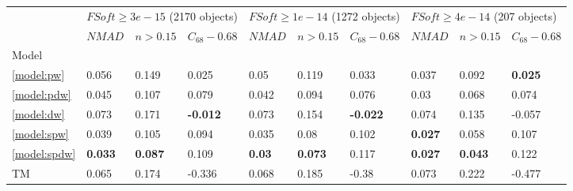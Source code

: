 \documentclass[fleqn,usenatbib]{mnras}
\begin{document}
\begin{table}
	\begin{tabular}{llllllllll}
            \hline
            {} & \multicolumn{3}{l}{$FSoft \geq 3e-15$ (2170 objects)} & \multicolumn{3}{l}{$FSoft \geq 1e-14$ (1272 objects)} & \multicolumn{3}{l}{$FSoft \geq 4e-14$ (207 objects)} \\
            {} &                            $NMAD$ &        $n>0.15$ &  $C_{68} - 0.68$ &                            $NMAD$ &        $n>0.15$ &  $C_{68} - 0.68$ &                           $NMAD$ &        $n>0.15$ & $C_{68} - 0.68$ \\
            Model          &                                   &                 &                  &                                   &                 &                  &                                  &                 &                 \\
            \hline
            \ref{model:pw}             &                             0.056 &           0.149 &            0.025 &                              0.05 &           0.119 &            0.033 &                            0.037 &           0.092 &  \textbf{0.025} \\
            \ref{model:pdw}            &                             0.045 &           0.107 &            0.079 &                             0.042 &           0.094 &            0.076 &                             0.03 &           0.068 &           0.074 \\
            \ref{model:dw}             &                             0.073 &           0.171 &  \textbf{-0.012} &                             0.073 &           0.154 &  \textbf{-0.022} &                            0.074 &           0.135 &          -0.057 \\
            \ref{model:spw}            &                             0.039 &           0.105 &            0.094 &                             0.035 &            0.08 &            0.102 &                   \textbf{0.027} &           0.058 &           0.107 \\
            \ref{model:spdw}           &                    \textbf{0.033} &  \textbf{0.087} &            0.109 &                     \textbf{0.03} &  \textbf{0.073} &            0.117 &                   \textbf{0.027} &  \textbf{0.043} &           0.122 \\
            TM &                             0.065 &           0.174 &           -0.336 &                             0.068 &           0.185 &            -0.38 &                            0.073 &           0.222 &          -0.477 \\

\end{tabular}
\end{table}
\end{document}
